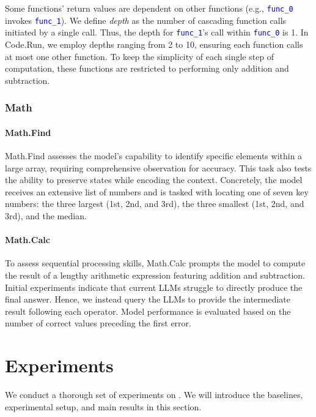 Some functions' return values are dependent on other functions (e.g., \textcolor{blue}{\texttt{func\_0}} invokes \textcolor{blue}{\texttt{func\_1}}). We define \emph{depth} as the number of cascading function calls initiated by a single call. Thus, the depth for \textcolor{blue}{\texttt{func\_1}}'s call within \textcolor{blue}{\texttt{func\_0}} is 1. In Code.Run, we employ depths ranging from 2 to 10, ensuring each function calls at most one other function. To keep the simplicity of each single step of computation, these functions are restricted to performing only addition and subtraction.

\subsubsection{Math}

\paragraph{Math.Find} 

Math.Find assesses the model's capability to identify specific elements within a large array, requiring comprehensive observation for accuracy. This task also tests the ability to preserve states while encoding the context. Concretely, the model receives an extensive list of numbers and is tasked with locating one of seven key numbers: the three largest (1st, 2nd, and 3rd), the three smallest (1st, 2nd, and 3rd), and the median.

\paragraph{Math.Calc} 

To assess sequential processing skills, Math.Calc prompts the model to compute the result of a lengthy arithmetic expression featuring addition and subtraction. Initial experiments indicate that current LLMs struggle to directly produce the final answer. Hence, we instead query the LLMs to provide the intermediate result following each operator. Model performance is evaluated based on the number of correct values preceding the first error.

\section{Experiments} %

We conduct a thorough set of experiments on \OURS. We will introduce the baselines, experimental setup, and main results in this section.
